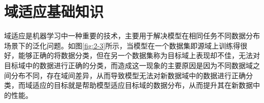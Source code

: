 \section{域适应基础知识}
域适应是机器学习中一种重要的技术，主要用于解决模型在相同任务不同数据分布场景下的泛化问题。如图\ref{fig:2-3}所示，当模型在一个数据集即源域上训练得很好，能够正确的将数据分类，但在另一个数据集称为目标域上表现却不佳，无法对目标域中的数据进行正确的分类，而造成这一现象的主要原因是因为不同数据域之间分布不同，存在域间差异，从而导致模型无法对新数据域中的数据进行正确分类，而域适应的目标就是帮助模型适应目标域的数据分布，从而提升其在新数据中的性能。
